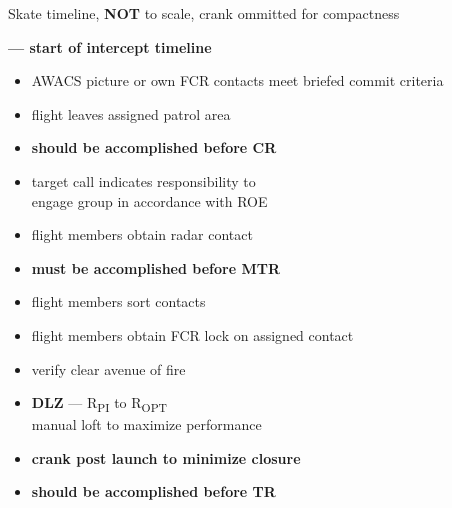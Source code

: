 \begin{checklistenumerate}[start=0]
{\begin{tikzpicture}[figstyle]

        \end{tikzpicture}
        \caption{Skate timeline, \textbf{NOT} to scale, crank ommitted for compactness}
        \label{fig:ttpaa:timeline:skate}
    }%
    \textbf{--- start of intercept timeline}
    \begin{itemize}
        \item AWACS picture or own FCR contacts meet briefed commit criteria
        \item flight leaves assigned patrol area
        \item \textbf{should be accomplished before CR}
    \end{itemize}

    \blueitem[Target]
    \label{subsec:ttpaa:timeline:skate:target}
    \begin{itemize}
        \item target call indicates responsibility to \\
        engage group in accordance with ROE
        \item flight members obtain radar contact
        \item \textbf{must be accomplished before MTR}
    \end{itemize}

    \blueitem[Sort]
    \label{subsec:ttpaa:timeline:skate:sort}
    \begin{itemize}
        \item flight members sort contacts
        \item flight members obtain FCR lock on assigned contact
    \end{itemize}

    \blueitem[Employment]
    \label{subsec:ttpaa:timeline:skate:shoot}
    \begin{itemize} 
        \item verify clear avenue of fire
        \item \textbf{DLZ} --- R\textsubscript{PI} to R\textsubscript{OPT}\\
        manual loft to maximize performance
        \item \textbf{crank post launch to minimize closure}
        \item \textbf{should be accomplished before TR}
    \end{itemize}
    


\end{checklistenumerate}
